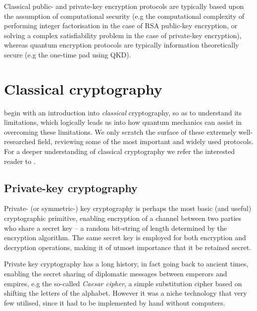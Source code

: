 Classical public- and private-key encryption protocols are typically based upon the assumption of computational security (e.g the computational complexity of performing integer factorisation in the case of RSA public-key encryption, or solving a complex satisfiability problem in the case of private-key encryption), whereas quantum encryption protocols are typically information theoretically secure (e.g the one-time pad using QKD).

%
%

\section{Classical cryptography}

 begin with an introduction into \textit{classical} cryptography, so as to understand its limitations, which logically leads us into how quantum mechanics can assist in overcoming these limitations. We only scratch the surface of these extremely well-researched field, reviewing some of the most important and widely used protocols. For a deeper understanding of classical cryptography we refer the interested reader to \cite{bib:Schneier96}.

%
%

\subsection{Private-key cryptography}

Private- (or symmetric-) key cryptography is perhaps the most basic (and useful) cryptographic primitive, enabling encryption of a channel between two parties who share a secret key -- a random bit-string of length determined by the encryption algorithm. The same secret key is employed for both encryption and decryption operations, making it of utmost importance that it be retained secret.

Private key cryptography has a long history, in fact going back to ancient times, enabling the secret sharing of diplomatic messages between emperors and empires, e.g the so-called \textit{Caesar cipher}, a simple substitution cipher based on shifting the letters of the alphabet. However it was a niche technology that very few utilised, since it had to be implemented by hand without computers.

